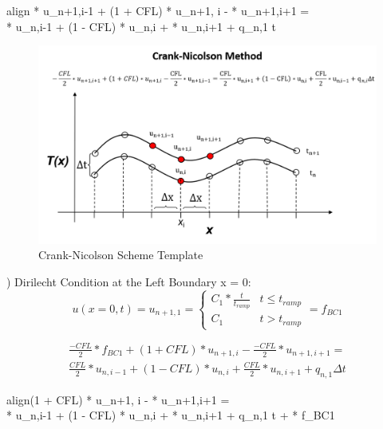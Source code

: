 \documentclass[10pt, letter, showtrims]{extarticle}
\newcommand{\boxedeq}[2]{\begin{empheq}[box={\fboxsep=6pt\fbox}]{align}\label{#1}#2\end{empheq}}
\begin{document}
		\boxedeq{eq:cn2}{ * u_{n+1,i-1} + (1 + CFL) * u_{n+1, i} - \frac{CFL}{2} * u_{n+1,i+1} = \\ \frac{CFL}{2} * u_{n,i-1} + (1 - CFL) * u_{n,i} + \frac{CFL}{2} * u_{n,i+1} + q_{n,1} \Delta t}
		
		\FloatBarrier
		\begin{figure}[h]
			\centering
			\captionsetup{justification=centering}
			\includegraphics[width=0.75\linewidth]{"Figures/Crank_Nicolson_Method"}
			\caption{Crank-Nicolson Scheme Template}
			\label{fig:cn}
		\end{figure}
		\FloatBarrier
		
		) Dirilecht Condition at the Left Boundary x = 0:	\\
		
		\begin{equation}
			u(x=0, t) = u_{n+1, 1} = \begin{cases} 
          					C_{1} * \frac{t}{t_{ramp}} & t\leq t_{ramp} \\
          					C_{1}                      & t > t_{ramp}
       					\end{cases} = f_{BC1}
    		\end{equation}  		

		\begin{equation}
			\begin{split}
			\frac{-CFL}{2} * f_{BC1} + (1 + CFL) * u_{n+1, i} - \frac{-CFL}{2} * u_{n+1,i+1} = \\ 
			\frac{CFL}{2} * u_{n,i-1} + (1 - CFL) * u_{n,i} + \frac{CFL}{2} * u_{n,i+1} + q_{n,1} \Delta t
			\end{split}
		\end{equation}
		
		\boxedeq{}{(1 + CFL) * u_{n+1, i} -  * u_{n+1,i+1} = \\ \frac{CFL}{2} * u_{n,i-1} + (1 - CFL) * u_{n,i} + \frac{CFL}{2} * u_{n,i+1} + q_{n,1} \Delta t + \frac{CFL}{2} * f_{BC1}}    		
    		
\end{document}
